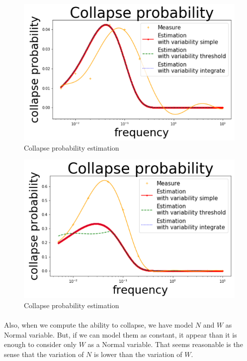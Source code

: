 \documentclass{article}
\begin{document}
\begin{figure}[h!]
\centering
\includegraphics[width=12cm]{cp.png}
\caption{Collapse probability estimation}
\end{figure}

\newpage

\begin{figure}[h!]
\centering
\includegraphics[width=12cm]{cp_threshold.png}
\caption{Collapse probability estimation}
\label{fig:cp_est_comparaison}
\end{figure}


\paragraph{}
Also, when we compute the ability to collapse, we have model $N$ and $W$ as Normal variable. But, if we can model them as constant, it appear than it is enough to consider only $W$ as a Normal variable. That seems reasonable is the sense that the variation of $N$ is lower than the variation of $W$. 
\end{document}
